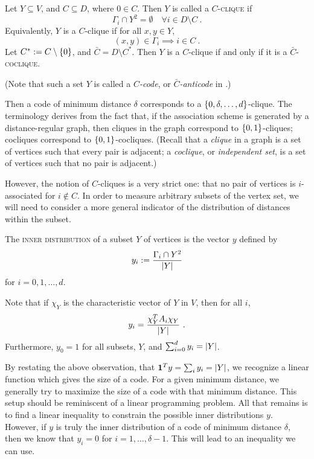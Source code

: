 \documentclass{report}
\newcommand{\vone}{\mathbf{1}}
\begin{document}
    \begin{defn}
      \label{defn:AS-clique}
      Let $Y \subseteq V$, and $C \subseteq D$, where $0 \in C$.
      Then $Y$ is called a \textsc{$C$-clique} if
      $$
        \Gamma_i \cap Y^2 = \emptyset \quad \forall i \in D \setminus C
        \ .
      $$
      Equivalently, $Y$ is a $C$-clique if for all $x, y \in Y$,
      $$
        (x, y) \in \Gamma_i \implies i \in C
        \ .
      $$
      Let $C^* := C \setminus \left\lbrace 0 \right\rbrace$, and $\bar{C} = D \setminus C^*$.
      Then $Y$ is a $C$-clique if and only if it is a
      \textsc{$\bar{C}$-coclique}.

      (Note that such a set $Y$ is called a \textit{$C$-code},
      or \textit{$\bar{C}$-anticode} in \cite{godsil}.)
    \end{defn}

    Then a code of minimum distance $\delta$ corresponds to a $\left\lbrace 0, \delta,
    \ldots, d \right\rbrace$-clique.  The terminology derives from the fact that, if the
    association scheme is generated by a distance-regular graph, then cliques in
    the graph correspond to $\left\lbrace 0, 1 \right\rbrace$-cliques; cocliques correspond to
    $\left\lbrace 0, 1 \right\rbrace$-cocliques.  (Recall that a \textit{clique} in a graph is a set
    of vertices such that every pair is adjacent; a \textit{coclique}, or
    \textit{independent set}, is a set of vertices such that no pair is
    adjacent.)

    However, the notion of $C$-cliques is a very strict one: that no pair of
    vertices is $i$-associated for $i \not\in C$.  In order to measure arbitrary
    subsets of the vertex set, we will need to consider a more general indicator
    of the distribution of distances within the subset.

    \begin{defn}\label{defn:inner-distribution}
      The \textsc{inner distribution} of a subset $Y$ of vertices is the vector
      $y$ defined by
      $$
        y_i := \frac{ \Gamma_i \cap Y^2 }{ \left\lvert Y \right\rvert }
      $$
      for $i = 0, 1, \ldots, d$.  
    \end{defn}

    Note that if $\chi_Y$ is the characteristic vector of $Y$ in $V$, then
    for all $i$,
    $$
      y_i = \frac{ \chi_Y^T A_i \chi_Y }{ \left\lvert Y \right\rvert } \ .
    $$
    Furthermore, $y_0 = 1$ for all subsets, $Y$, and $\sum_{i = 0}^d y_i =
    \left\lvert Y \right\rvert$.  

    By restating the above observation, that $\vone^T y = \sum_i y_i = \abs{Y}$,
    we recognize a linear function which gives the size of a code.  For a given
    minimum distance, we generally try to maximize the size of a code with that
    minimum distance.  This setup should be reminiscent of a linear programming
    problem.  All that remains is to find a linear inequality to constrain the
    possible inner distributions $y$.  However, if $y$ is truly the inner
    distribution of a code of minimum distance $\delta$, then we know that $y_i
    = 0$ for $i = 1, \ldots, \delta - 1$.  This will lead to an inequality we
    can use.
\end{document}
